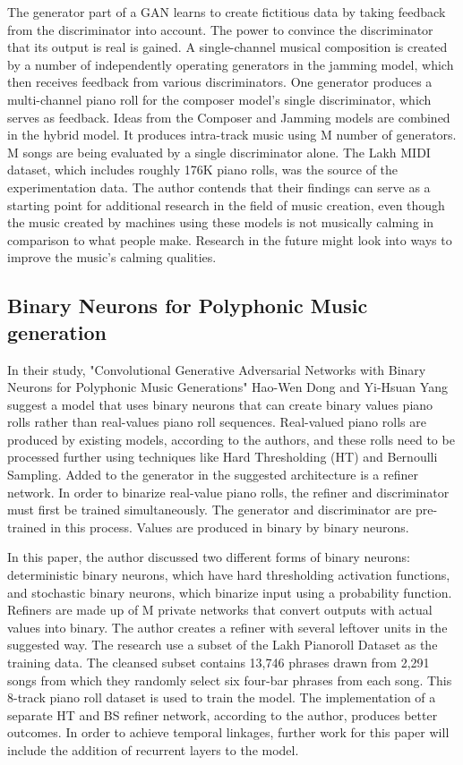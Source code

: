 \documentclass[letterpaper]{article}
\begin{document}
The generator part of a GAN learns to create fictitious data by taking feedback from the discriminator into account. The power to convince the discriminator that its output is real is gained. A single-channel musical composition is created by a number of independently operating generators in the jamming model, which then receives feedback from various discriminators. One generator produces a multi-channel piano roll for the composer model's single discriminator, which serves as feedback. Ideas from the Composer and Jamming models are combined in the hybrid model. It produces intra-track music using M number of generators. M songs are being evaluated by a single discriminator alone. The Lakh MIDI dataset, which includes roughly 176K piano rolls, was the source of the experimentation data. The author contends that their findings can serve as a starting point for additional research in the field of music creation, even though the music created by machines using these models is not musically calming in comparison to what people make. Research in the future might look into ways to improve the music's calming qualities.

\subsection{Binary Neurons for Polyphonic Music generation}
In their study, "Convolutional Generative Adversarial Networks with Binary Neurons for Polyphonic Music Generations" Hao-Wen Dong and Yi-Hsuan Yang suggest a model that uses binary neurons that can create binary values piano rolls rather than real-values piano roll sequences\cite{b1}. Real-valued piano rolls are produced by existing models, according to the authors, and these rolls need to be processed further using techniques like Hard Thresholding (HT) and Bernoulli Sampling. Added to the generator in the suggested architecture is a refiner network. In order to binarize real-value piano rolls, the refiner and discriminator must first be trained simultaneously. The generator and discriminator are pre-trained in this process. Values are produced in binary by binary neurons.

In this paper, the author discussed two different forms of binary neurons: deterministic binary neurons, which have hard thresholding activation functions, and stochastic binary neurons, which binarize input using a probability function. Refiners are made up of M private networks that convert outputs with actual values into binary. The author creates a refiner with several leftover units in the suggested way. The research use a subset of the Lakh Pianoroll Dataset as the training data. The cleansed subset contains 13,746 phrases drawn from 2,291 songs from which they randomly select six four-bar phrases from each song. This 8-track piano roll dataset is used to train the model. The implementation of a separate HT and BS refiner network, according to the author, produces better outcomes. In order to achieve temporal linkages, further work for this paper will include the addition of recurrent layers to the model.
\end{document}
